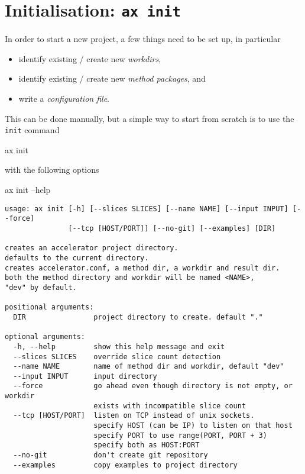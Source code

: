 \section{Initialisation: \texttt{ax init}}
\label{sec:initialisation}
In order to start a new project, a few things need to be set up, in
particular
\begin{itemize}
\item[] identify existing / create new \textsl{workdirs},
\item[] identify existing / create new \textsl{method packages}, and
\item[] write a \textsl{configuration file}.
\end{itemize}
This can be done manually, but a simple way to start from scratch is
to use the \texttt{init} command
\begin{shell}
ax init
\end{shell}
with the following options
\begin{shell}
ax init --help
\end{shell}
\begin{snugshade}
\begin{verbatim}
usage: ax init [-h] [--slices SLICES] [--name NAME] [--input INPUT] [--force]
               [--tcp [HOST/PORT]] [--no-git] [--examples] [DIR]

creates an accelerator project directory.
defaults to the current directory.
creates accelerator.conf, a method dir, a workdir and result dir.
both the method directory and workdir will be named <NAME>,
"dev" by default.

positional arguments:
  DIR                project directory to create. default "."

optional arguments:
  -h, --help         show this help message and exit
  --slices SLICES    override slice count detection
  --name NAME        name of method dir and workdir, default "dev"
  --input INPUT      input directory
  --force            go ahead even though directory is not empty, or workdir
                     exists with incompatible slice count
  --tcp [HOST/PORT]  listen on TCP instead of unix sockets.
                     specify HOST (can be IP) to listen on that host
                     specify PORT to use range(PORT, PORT + 3)
                     specify both as HOST:PORT
  --no-git           don't create git repository
  --examples         copy examples to project directory
\end{verbatim}
\end{snugshade}




